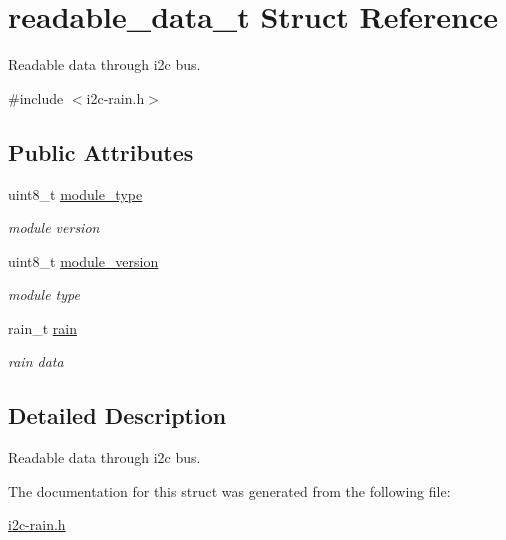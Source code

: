 \hypertarget{structreadable__data__t}{}\section{readable\+\_\+data\+\_\+t Struct Reference}
\label{structreadable__data__t}


Readable data through i2c bus.  




{\ttfamily \#include $<$i2c-\/rain.\+h$>$}

\subsection*{Public Attributes}
\begin{DoxyCompactItemize}
\item 
\mbox{\label{structreadable__data__t_a650c71ad521e965abe34eafda7cf872d}} 
uint8\+\_\+t \hyperlink{structreadable__data__t_a650c71ad521e965abe34eafda7cf872d}{module\+\_\+type}
\begin{DoxyCompactList}\small\item\em module version \end{DoxyCompactList}\item 
\mbox{\label{structreadable__data__t_a0b5fa5d2d89bef1b53036512525127f0}} 
uint8\+\_\+t \hyperlink{structreadable__data__t_a0b5fa5d2d89bef1b53036512525127f0}{module\+\_\+version}
\begin{DoxyCompactList}\small\item\em module type \end{DoxyCompactList}\item 
\mbox{\label{structreadable__data__t_a183ab6eb973fe8deb1c6d0583a991e92}} 
rain\+\_\+t \hyperlink{structreadable__data__t_a183ab6eb973fe8deb1c6d0583a991e92}{rain}
\begin{DoxyCompactList}\small\item\em rain data \end{DoxyCompactList}\end{DoxyCompactItemize}


\subsection{Detailed Description}
Readable data through i2c bus. 

The documentation for this struct was generated from the following file\+:\begin{DoxyCompactItemize}
\item 
\hyperlink{i2c-rain_8h}{i2c-\/rain.\+h}\end{DoxyCompactItemize}

